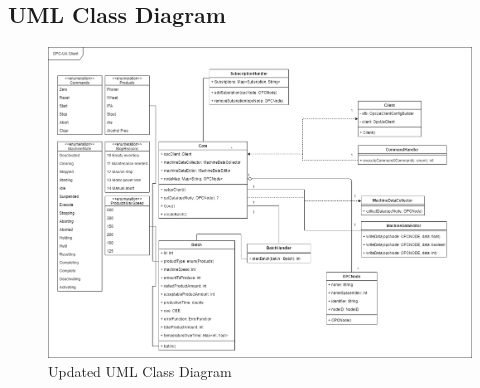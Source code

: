\subsection{UML Class Diagram}\label{app:uml}

\begin{figure}[H]
	\centering
	\includegraphics[scale=0.485, angle =90]{images/diagrams/updated_UML_Class_Diagram.drawio.png}
	\caption{Updated UML Class Diagram}
\end{figure}